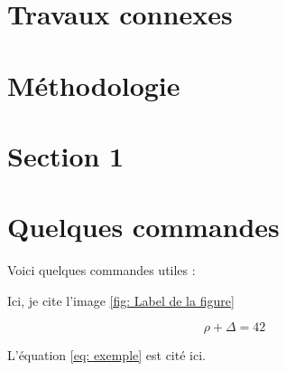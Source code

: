 \documentclass{rapportCS}
\begin{document}
\section{Travaux connexes}
\lipsum[1-2] 





\newpage

\section{Méthodologie}
\lipsum[2-3]





\newpage

\section{Section 1}




\section{Quelques commandes}

Voici quelques commandes utiles :



Ici, je cite l'image \ref{fig: Label de la figure}



\begin{equation} \label{eq: exemple}
\rho + \Delta = 42
\end{equation}

L'équation \ref{eq: exemple} est cité ici. 
\end{document}
